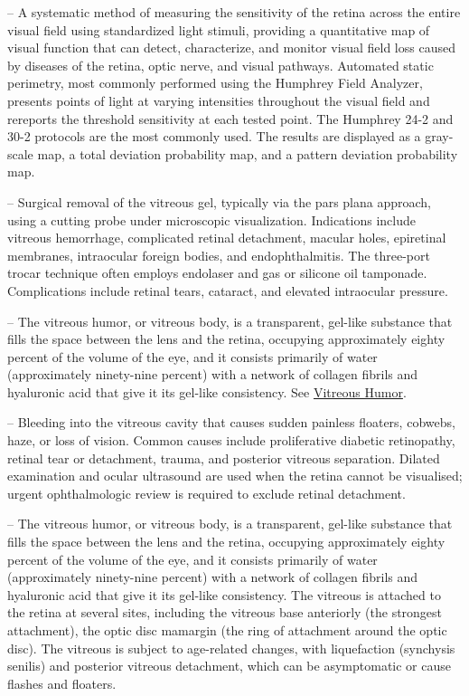 -- A systematic method of measuring the sensitivity of the retina across the entire visual field using standardized light stimuli, providing a quantitative map of visual function that can detect, characterize, and monitor visual field loss caused by diseases of the retina, optic nerve, and visual pathways. Automated static perimetry, most commonly performed using the Humphrey Field Analyzer, presents points of light at varying intensities throughout the visual field and rereports the threshold sensitivity at each tested point. The Humphrey 24-2 and 30-2 protocols are the most commonly used. The results are displayed as a gray-scale map, a total deviation probability map, and a pattern deviation probability map.

-- Surgical removal of the vitreous gel, typically via the pars plana approach, using a cutting probe under microscopic visualization. Indications include vitreous hemorrhage, complicated retinal detachment, macular holes, epiretinal membranes, intraocular foreign bodies, and endophthalmitis. The three-port trocar technique often employs endolaser and gas or silicone oil tamponade. Complications include retinal tears, cataract, and elevated intraocular pressure.

-- The vitreous humor, or vitreous body, is a transparent, gel-like substance that fills the space between the lens and the retina, occupying approximately eighty percent of the volume of the eye, and it consists primarily of water (approximately ninety-nine percent) with a network of collagen fibrils and hyaluronic acid that give it its gel-like consistency. See \hyperlink{Vitreous Humor}{Vitreous Humor}.

-- Bleeding into the vitreous cavity that causes sudden painless floaters, cobwebs, haze, or loss of vision. Common causes include proliferative diabetic retinopathy, retinal tear or detachment, trauma, and posterior vitreous separation. Dilated examination and ocular ultrasound are used when the retina cannot be visualised; urgent ophthalmologic review is required to exclude retinal detachment.

-- The vitreous humor, or vitreous body, is a transparent, gel-like substance that fills the space between the lens and the retina, occupying approximately eighty percent of the volume of the eye, and it consists primarily of water (approximately ninety-nine percent) with a network of collagen fibrils and hyaluronic acid that give it its gel-like consistency. The vitreous is attached to the retina at several sites, including the vitreous base anteriorly (the strongest attachment), the optic disc mamargin (the ring of attachment around the optic disc). The vitreous is subject to age-related changes, with liquefaction (synchysis senilis) and posterior vitreous detachment, which can be asymptomatic or cause flashes and floaters.

